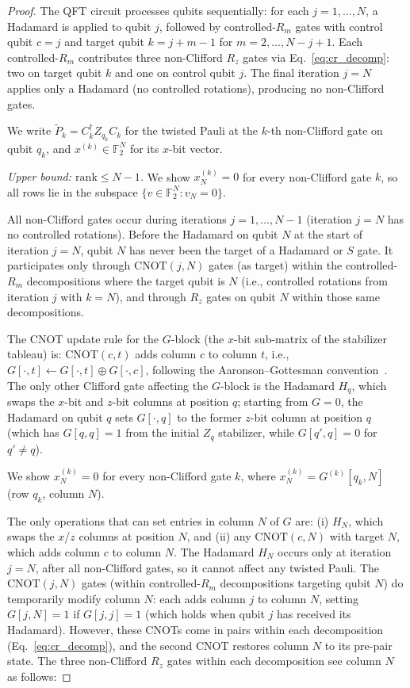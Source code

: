 \documentclass[a4paper,twocolumn,11pt]{quantumarticle}
\begin{document}
\begin{proof}
The QFT circuit processes qubits sequentially: for each $j = 1, \ldots, N$, a Hadamard is applied to qubit $j$, followed by controlled-$R_m$ gates with control qubit $c = j$ and target qubit $k = j + m - 1$ for $m = 2, \ldots, N - j + 1$.
Each controlled-$R_m$ contributes three non-Clifford $R_z$ gates via Eq.~\eqref{eq:cr_decomp}: two on target qubit $k$ and one on control qubit $j$.
The final iteration $j = N$ applies only a Hadamard (no controlled rotations), producing no non-Clifford gates.

We write $\tilde{P}_k = C_k^\dagger Z_{q_k} C_k$ for the twisted Pauli at the $k$-th non-Clifford gate on qubit $q_k$, and $x^{(k)} \in \mathbb{F}_2^N$ for its $x$-bit vector.

\medskip
\noindent\emph{Upper bound: $\mathrm{rank} \le N - 1$.}\quad
We show $x^{(k)}_N = 0$ for every non-Clifford gate $k$, so all rows lie in the subspace $\{v \in \mathbb{F}_2^N : v_N = 0\}$.

All non-Clifford gates occur during iterations $j = 1, \ldots, N - 1$ (iteration $j = N$ has no controlled rotations).
Before the Hadamard on qubit $N$ at the start of iteration $j = N$, qubit $N$ has never been the target of a Hadamard or $S$ gate.
It participates only through $\mathrm{CNOT}(j, N)$ gates (as target) within the controlled-$R_m$ decompositions where the target qubit is $N$ (i.e., controlled rotations from iteration $j$ with $k = N$), and through $R_z$ gates on qubit $N$ within those same decompositions.

The CNOT update rule for the $G$-block (the $x$-bit sub-matrix of the stabilizer tableau) is: $\mathrm{CNOT}(c, t)$ adds column $c$ to column $t$, i.e., $G[\cdot, t] \leftarrow G[\cdot, t] \oplus G[\cdot, c]$, following the Aaronson--Gottesman convention~\cite{Aaronson2004}.
The only other Clifford gate affecting the $G$-block is the Hadamard $H_q$, which swaps the $x$-bit and $z$-bit columns at position $q$; starting from $G = 0$, the Hadamard on qubit $q$ sets $G[\cdot, q]$ to the former $z$-bit column at position $q$ (which has $G[q, q] = 1$ from the initial $Z_q$ stabilizer, while $G[q', q] = 0$ for $q' \ne q$).

We show $x^{(k)}_N = 0$ for every non-Clifford gate $k$, where $x^{(k)}_N = G^{(k)}[q_k, N]$ (row $q_k$, column $N$).

The only operations that can set entries in column $N$ of $G$ are: (i) $H_N$, which swaps the $x$/$z$ columns at position $N$, and (ii) any $\mathrm{CNOT}(c, N)$ with target $N$, which adds column $c$ to column $N$.
The Hadamard $H_N$ occurs only at iteration $j = N$, after all non-Clifford gates, so it cannot affect any twisted Pauli.
The $\mathrm{CNOT}(j, N)$ gates (within controlled-$R_m$ decompositions targeting qubit $N$) do temporarily modify column $N$: each adds column $j$ to column $N$, setting $G[j, N] = 1$ if $G[j, j] = 1$ (which holds when qubit $j$ has received its Hadamard).
However, these CNOTs come in pairs within each decomposition (Eq.~\eqref{eq:cr_decomp}), and the second CNOT restores column $N$ to its pre-pair state.
The three non-Clifford $R_z$ gates within each decomposition see column $N$ as follows:


\end{proof}
\end{document}
